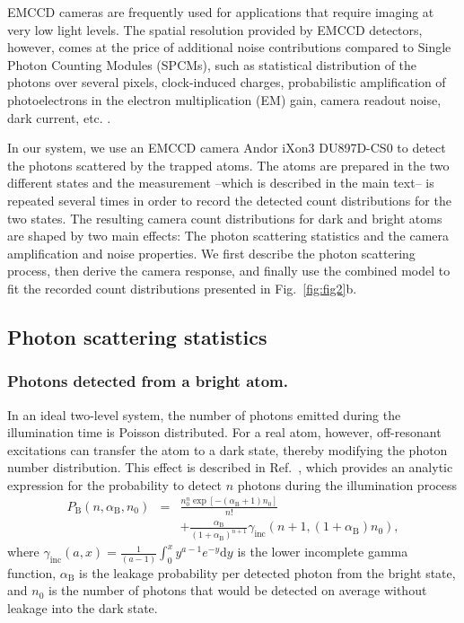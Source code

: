 \documentclass[aps,prl,twocolumn,english,showpacs]{revtex4-1}
\begin{document}
EMCCD cameras are frequently used for applications that require imaging at very low light levels. The spatial resolution provided by EMCCD detectors, however, comes at the price of additional noise contributions compared to Single Photon Counting Modules (SPCMs), such as statistical distribution of the photons over several pixels, clock-induced charges, probabilistic amplification of photoelectrons in the electron multiplication (EM) gain, camera readout noise, dark current, etc. \cite{Robbins2011}.

In our system, we use an EMCCD camera Andor iXon3 DU897D-CS0 to detect the photons scattered by the trapped atoms. The atoms are prepared in the two different states and the measurement --which is described in the main text-- is repeated several times in order to record the detected count distributions for the two states. The resulting camera count distributions for dark and bright atoms are shaped by two main effects: The photon scattering statistics and the camera amplification and noise properties. We first describe the photon scattering process, then derive the camera response, and finally use the combined model to fit the recorded count distributions presented in  Fig.~\ref{fig:fig2}b.


\subsection{Photon scattering statistics}

\subsubsection{Photons detected from a bright atom.}

In an ideal two-level system, the number of photons emitted during the illumination time is Poisson distributed. For a real atom, however, off-resonant excitations can transfer the atom to a dark state, thereby modifying the photon number distribution. This effect is described in Ref.~\cite{acton2006}, which provides an analytic expression for the probability to detect $n$ photons during the illumination process
\begin{eqnarray}\label{eq:AtomPhotonDistribution}
P_{\text{B}}\left( n,\alpha_{\text{B}},n_{0} \right)&=&
\frac{n _{0}^{n}\exp \left[-\left( \alpha_{\text{B}} +1\right) n _{0}\right] }{n!}\\
&&+\frac{\alpha_{\text{B}} }{\left(1+\alpha_{\text{B}} \right) ^{n+1}}\gamma_\text{inc}\left( n+1,\left( 1+\alpha_{\text{B}} \right) n_{0}\right), \nonumber
\end{eqnarray}
where $\gamma_\text{inc}\left( a,x\right) =\frac{1}{\left( a-1\right)}\int_{0}^{x}y^{a-1}e^{-y}\text{d}y$ is the lower incomplete gamma function, $\alpha_{\text{B}}$ is the leakage probability per detected photon from the bright state, and $n_{0}$ is the number of photons that would be detected on average without leakage into the dark state.\\
\end{document}
